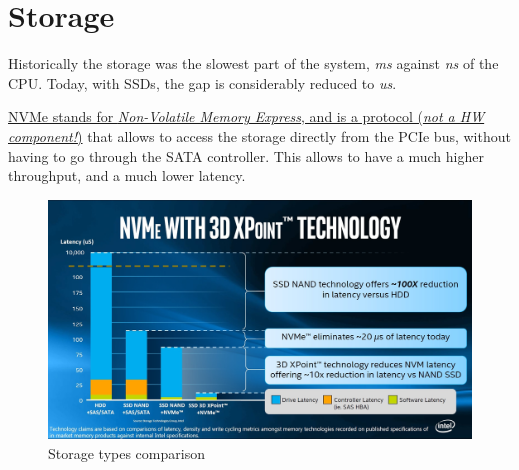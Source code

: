 \chapter{Storage}


\begin{paracol}{2}
   
   Historically the storage was the slowest part of the system, \textit{ms} against \textit{ns} of the CPU.
   Today, with SSDs, the gap is considerably reduced to \textit{us}.
   
   \ul{NVMe stands for \textit{Non-Volatile Memory Express}, and is a protocol (\textit{not a HW component!})} that allows to access the storage directly from the PCIe bus, without having to go through the SATA controller. This allows to have a much higher throughput, and a much lower latency.

   \switchcolumn

   \begin{figure}[htbp]
      \centering
      \includegraphics{images/storage_intel.jpg}
      \caption{Storage types comparison}
      \label{fig:storage_intel}
   \end{figure}
\end{paracol}

